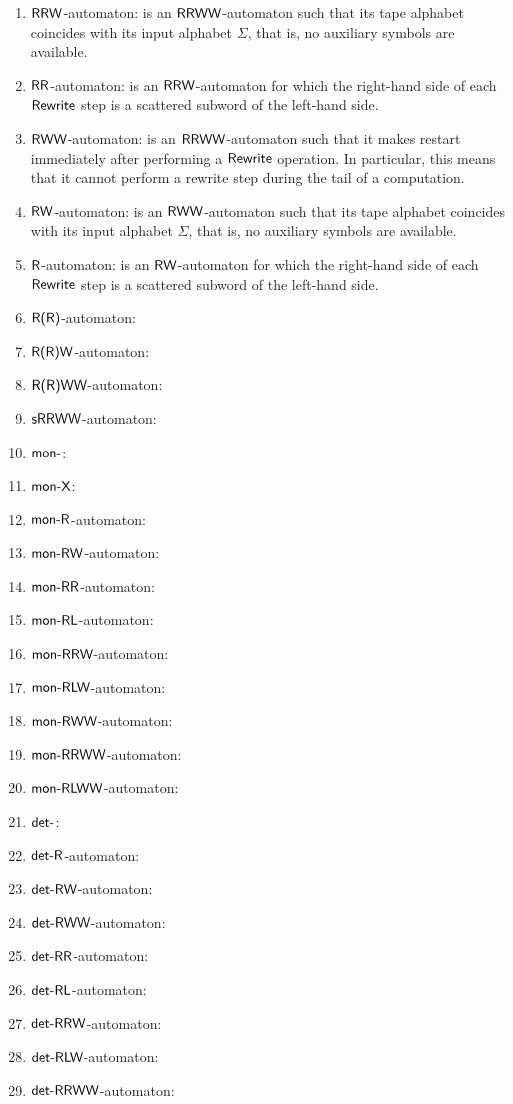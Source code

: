 \begin{enumerate}[]
\item $\textup{\sf RRW}$-automaton: is an $\textup{\sf RRWW}$-automaton such that its tape alphabet coincides with its input alphabet $\Sigma$, that is, no auxiliary symbols are available.
\item $\textup{\sf RR}$-automaton: is an $\textup{\sf RRW}$-automaton for which the right-hand side of each $\textup{\sf Rewrite}$ step is a scattered subword of the left-hand side.
\item $\textup{\sf RWW}$-automaton: is an $\textup{\sf RRWW}$-automaton such that it makes restart immediately after performing a $\textup{\sf Rewrite}$ operation. In particular, this means that it cannot perform a rewrite step during the tail of a computation.
\item $\textup{\sf RW}$-automaton: is an $\textup{\sf RWW}$-automaton such that its tape alphabet coincides with its input alphabet $\Sigma$, that is, no auxiliary symbols are available.
\item $\textup{\sf R}$-automaton: is an $\textup{\sf RW}$-automaton for which the right-hand side of each $\textup{\sf Rewrite}$ step is a scattered subword of the left-hand side.
\item $\textup{\sf R(R)}$-automaton: 
\item $\textup{\sf R(R)W}$-automaton: 
\item $\textup{\sf R(R)WW}$-automaton: 
\item $\textup{\sf sRRWW}$-automaton: 
\item $\textup{\sf mon-}$: 
\item $\textup{\sf mon-X}$: 
\item $\textup{\sf mon-R}$-automaton: 
\item $\textup{\sf mon-RW}$-automaton: 
\item $\textup{\sf mon-RR}$-automaton: 
\item $\textup{\sf mon-RL}$-automaton: 
\item $\textup{\sf mon-RRW}$-automaton: 
\item $\textup{\sf mon-RLW}$-automaton: 
\item $\textup{\sf mon-RWW}$-automaton: 
\item $\textup{\sf mon-RRWW}$-automaton: 
\item $\textup{\sf mon-RLWW}$-automaton: 
\item $\textup{\sf det-}$: 
\item $\textup{\sf det-R}$-automaton: 
\item $\textup{\sf det-RW}$-automaton: 
\item $\textup{\sf det-RWW}$-automaton: 
\item $\textup{\sf det-RR}$-automaton: 
\item $\textup{\sf det-RL}$-automaton: 
\item $\textup{\sf det-RRW}$-automaton: 
\item $\textup{\sf det-RLW}$-automaton: 
\item $\textup{\sf det-RRWW}$-automaton: 

\end{enumerate}
